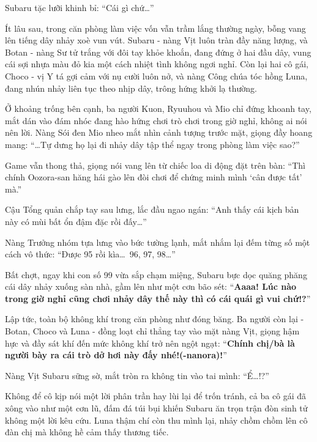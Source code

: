 \documentclass[../main.tex]{subfiles}
\begin{document}
Subaru tặc lưỡi khinh bỉ: ``Cái gì chứ\dots''

\ct

Ít lâu sau, trong căn phòng làm việc vốn vẫn trầm lắng thường ngày, bỗng vang lên tiếng dây nhảy xoè vun vút. Subaru - nàng Vịt luôn tràn đầy năng lượng, và Botan - nàng Sư tử trắng với đôi tay khỏe khoắn, đang đứng ở hai đầu dây, vung cái sợi nhựa màu đỏ kia một cách nhiệt tình không ngơi nghỉ. Còn lại hai cô gái, Choco - vị Y tá gợi cảm với nụ cười luôn nở, và nàng Công chúa tóc hồng Luna, đang nhún nhảy liên tục theo nhịp dây, trông hứng khởi lạ thường.


Ở khoảng trống bên cạnh, ba người Kuon, Ryuuhou và Mio chỉ đứng khoanh tay, mắt dán vào đám nhóc đang hào hứng chơi trò chơi trong giờ nghỉ, không ai nói nên lời. Nàng Sói đen Mio nheo mắt nhìn cảnh tượng trước mặt, giọng đầy hoang mang: ``\dots Tự dưng họ lại đi nhảy dây tập thể ngay trong phòng làm việc sao?''

Game vẫn thong thả, giọng nói vang lên từ chiếc loa di động đặt trên bàn: ``Thì chính Oozora-san hăng hái gào lên đòi chơi để chứng minh mình `cân được tất' mà.''

Cậu Tổng quản chắp tay sau lưng, lắc đầu ngao ngán: ``Anh thấy cái kịch bản này có mùi bất ổn đậm đặc rồi đấy\dots''

Nàng Trưởng nhóm tựa lưng vào bức tường lạnh, mắt nhắm lại đếm từng số một cách vô thức: ``Được 95 rồi kìa\dots\ 96, 97, 98\dots''

Bất chợt, ngay khi con số 99 vừa sắp chạm miệng, Subaru bực dọc quăng phăng cái dây nhảy xuống sàn nhà, gầm lên như một cơn bão sét: ``\textbf{Aaaa! Lúc nào trong giờ nghỉ cũng chơi nhảy dây thế này thì có cái quái gì vui chứ!?}''

Lập tức, toàn bộ không khí trong căn phòng như đóng băng. Ba người còn lại - Botan, Choco và Luna - đồng loạt chỉ thẳng tay vào mặt nàng Vịt, giọng hậm hực và đầy sát khí đến mức không khí trở nên ngột ngạt: ``\textbf{Chính chị/bà là người bày ra cái trò dở hơi này đấy nhé!(-nanora)!}''

Nàng Vịt Subaru sững sờ, mắt tròn ra không tin vào tai mình: ``Ể\dots!?''

Không để cô kịp nói một lời phân trần hay lùi lại để trốn tránh, cả ba cô gái đã xông vào như một cơn lũ, đấm đá túi bụi khiến Subaru ăn trọn trận đòn sinh tử không một lời kêu cứu. Luna thậm chí còn thu mình lại, nhảy chồm chồm lên cô đàn chị mà không hề cảm thấy thương tiếc.
\end{document}
